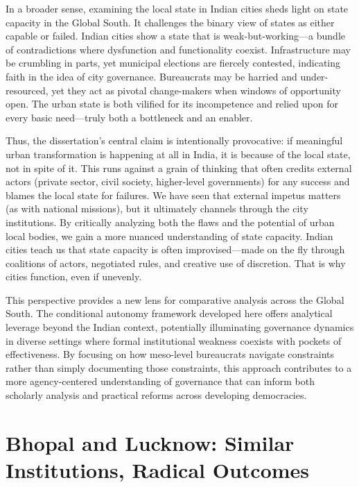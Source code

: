 In a broader sense, examining the local state in Indian cities sheds light on state capacity in the Global South. It challenges the binary view of states as either capable or failed. Indian cities show a state that is weak-but-working—a bundle of contradictions where dysfunction and functionality coexist. Infrastructure may be crumbling in parts, yet municipal elections are fiercely contested, indicating faith in the idea of city governance. Bureaucrats may be harried and under-resourced, yet they act as pivotal change-makers when windows of opportunity open. The urban state is both vilified for its incompetence and relied upon for every basic need—truly both a bottleneck and an enabler.

Thus, the dissertation's central claim is intentionally provocative: if meaningful urban transformation is happening at all in India, it is because of the local state, not in spite of it. This runs against a grain of thinking that often credits external actors (private sector, civil society, higher-level governments) for any success and blames the local state for failures. We have seen that external impetus matters (as with national missions), but it ultimately channels through the city institutions. By critically analyzing both the flaws and the potential of urban local bodies, we gain a more nuanced understanding of state capacity. Indian cities teach us that state capacity is often improvised—made on the fly through coalitions of actors, negotiated rules, and creative use of discretion. That is why cities function, even if unevenly.

This perspective provides a new lens for comparative analysis across the Global South. The conditional autonomy framework developed here offers analytical leverage beyond the Indian context, potentially illuminating governance dynamics in diverse settings where formal institutional weakness coexists with pockets of effectiveness. By focusing on how meso-level bureaucrats navigate constraints rather than simply documenting those constraints, this approach contributes to a more agency-centered understanding of governance that can inform both scholarly analysis and practical reforms across developing democracies.






\section{Bhopal and Lucknow: Similar Institutions, Radical Outcomes}

